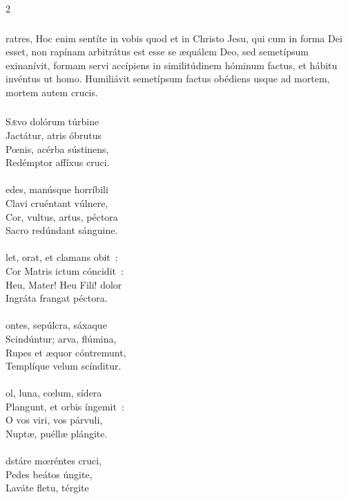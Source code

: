 \documentclass[9pt,twoside]{extarticle}
\begin{document}
\begin{multicols}{2}
\subsubsection*{}
ratres, Hoc enim sentíte in vobis quod et in Christo Jesu, qui cum in forma Dei esset, non rapínam arbitrátus est esse se æquálem Deo, sed semetípsum exinanívit, formam servi accípiens in similitúdinem hóminum factus, et hábitu invéntus ut homo. Humiliávit semetípsum factus obédiens usque ad mortem, mortem autem crucis.

\subsubsection*{\center{}}
\lettrine{S}ævo dolórum túrbine\\
Jactátur, atris óbrutus\\
Pœnis, acérba sústinens,\\
Redémptor affíxus cruci.\\
\\
edes, manúsque horríbili\\
Clavi cruéntant vúlnere,\\
Cor, vultus, artus, péctora\\
Sacro redúndant sánguine.\\
\\
let, orat, et clamans obit~:\\
Cor Matris ictum cóncidit~:\\
Heu, Mater! Heu Fili! dolor\\
Ingráta frangat péctora.\\
\\
ontes, sepúlcra, sáxaque\\
Scindúntur; arva, flúmina,\\
Rupes et æquor cóntremunt,\\
Templíque velum scínditur.\\
\\
ol, luna, cœlum, sídera\\
Plangunt, et orbis íngemit~:\\
O vos viri, vos párvuli,\\
Nuptæ, puéllæ plángite.\\
\\
dstáre mœréntes cruci,\\
Pedes beátos úngite,\\
Laváte fletu, térgite\\

\end{multicols}
\end{document}
